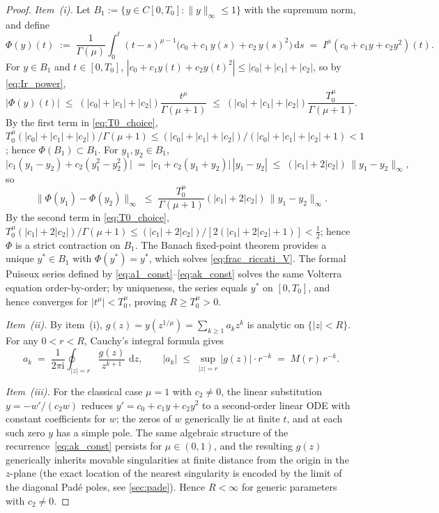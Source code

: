 \documentclass[11pt,a4paper]{article}
\newcommand{\dd}{\,\mathrm{d}}
\newcommand{\ii}{\mathrm{i}}
\begin{document}
\begin{proof}
\textit{Item~(i).}
Let \(B_1:=\{y\in C[0,T_0]:\|y\|_\infty\le1\}\) with the supremum norm, and define
\[
\Phi(y)(t)\;:=\;\frac{1}{\Gamma(\mu)}\int_0^t(t-s)^{\mu-1}\bigl(c_0+c_1\,y(s)+c_2\,y(s)^2\bigr)\dd s
\;=\;I^\mu(c_0+c_1y+c_2y^2)(t).
\]
For \(y\in B_1\) and \(t\in[0,T_0]\), \(|c_0+c_1y(t)+c_2y(t)^2|\le|c_0|+|c_1|+|c_2|\), so by \eqref{eq:Ir_power},
\[
|\Phi(y)(t)|\;\le\;(|c_0|+|c_1|+|c_2|)\frac{t^\mu}{\Gamma(\mu+1)}\;\le\;(|c_0|+|c_1|+|c_2|)\frac{T_0^\mu}{\Gamma(\mu+1)}.
\]
By the first term in \eqref{eq:T0_choice}, \(T_0^\mu(|c_0|+|c_1|+|c_2|)/\Gamma(\mu+1)\le(|c_0|+|c_1|+|c_2|)/(|c_0|+|c_1|+|c_2|+1)<1\); hence \(\Phi(B_1)\subset B_1\).
For \(y_1,y_2\in B_1\),
\[
\bigl|c_1(y_1{-}y_2)+c_2(y_1^2{-}y_2^2)\bigr|
\;=\;\bigl|c_1+c_2(y_1{+}y_2)\bigr|\,|y_1{-}y_2|
\;\le\;(|c_1|+2|c_2|)\,\|y_1{-}y_2\|_\infty,
\]
so
\[
\|\Phi(y_1)-\Phi(y_2)\|_\infty\;\le\;\frac{T_0^\mu}{\Gamma(\mu+1)}(|c_1|+2|c_2|)\,\|y_1-y_2\|_\infty.
\]
By the second term in \eqref{eq:T0_choice}, \(T_0^\mu(|c_1|+2|c_2|)/\Gamma(\mu+1)\le(|c_1|+2|c_2|)/[2(|c_1|+2|c_2|+1)]<\tfrac12\); hence \(\Phi\) is a strict contraction on \(B_1\).
The Banach fixed-point theorem provides a unique \(y^*\in B_1\) with \(\Phi(y^*)=y^*\), which solves \eqref{eq:frac_riccati_V}.
The formal Puiseux series defined by \eqref{eq:a1_const}--\eqref{eq:ak_const} solves the same Volterra equation order-by-order; by uniqueness, the series equals \(y^*\) on \([0,T_0]\), and hence converges for \(|t^\mu|<T_0^\mu\), proving \(R\ge T_0^\mu>0\).

\textit{Item~(ii).}
By item~(i), \(g(z)=y(z^{1/\mu})=\sum_{k\ge1}a_kz^k\) is analytic on \(\{|z|<R\}\). For any \(0<r<R\), Cauchy's integral formula gives
\[
a_k\;=\;\frac{1}{2\pi\ii}\oint_{|z|=r}\frac{g(z)}{z^{k+1}}\,\dd z,
\qquad
|a_k|\;\le\;\sup_{|z|=r}|g(z)|\cdot r^{-k}\;=\;M(r)\,r^{-k}.
\]

\textit{Item~(iii).}
For the classical case \(\mu=1\) with \(c_2\ne0\), the linear substitution \(y=-w'/(c_2 w)\) reduces $y'=c_0+c_1y+c_2y^2$ to a second-order linear ODE with constant coefficients for \(w\); the zeros of \(w\) generically lie at finite \(t\), and at each such zero \(y\) has a simple pole. The same algebraic structure of the recurrence~\eqref{eq:ak_const} persists for \(\mu\in(0,1)\), and the resulting \(g(z)\) generically inherits movable singularities at finite distance from the origin in the \(z\)-plane (the exact location of the nearest singularity is encoded by the limit of the diagonal Pad\'e poles, see \cref{sec:pade}).
Hence \(R<\infty\) for generic parameters with \(c_2\ne0\).
\end{proof}
\end{document}
